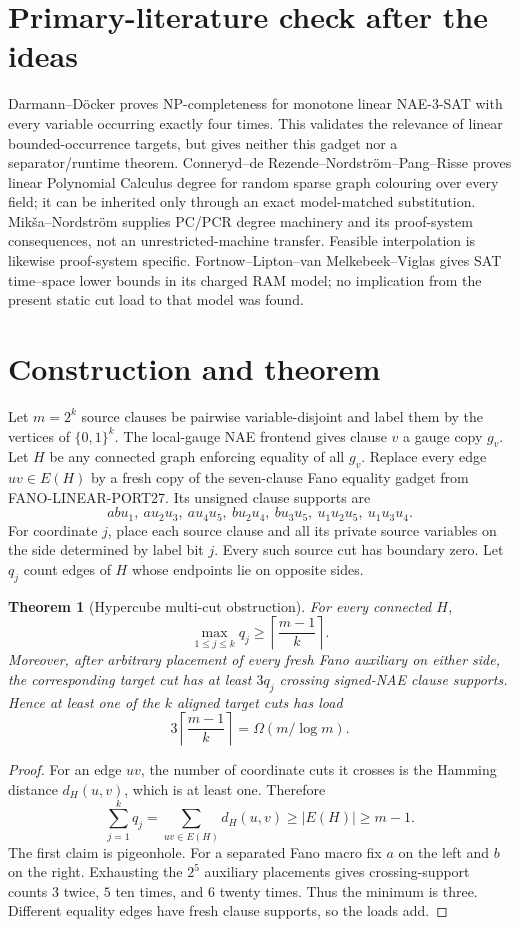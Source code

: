 \documentclass[11pt]{article}
\newtheorem{theorem}{Theorem}
\begin{document}
\section{Primary-literature check after the ideas}
Darmann--D\"ocker proves NP-completeness for monotone linear NAE-3-SAT with
every variable occurring exactly four times.  This validates the relevance of
linear bounded-occurrence targets, but gives neither this gadget nor a
separator/runtime theorem.  Conneryd--de Rezende--Nordstr\"om--Pang--Risse
proves linear Polynomial Calculus degree for random sparse graph colouring
over every field; it can be inherited only through an exact model-matched
substitution.  Mik\v{s}a--Nordstr\"om supplies PC/PCR degree machinery and its
proof-system consequences, not an unrestricted-machine transfer.  Feasible
interpolation is likewise proof-system specific.  Fortnow--Lipton--van
Melkebeek--Viglas gives SAT time--space lower bounds in its charged RAM model;
no implication from the present static cut load to that model was found.

\section{Construction and theorem}
Let $m=2^k$ source clauses be pairwise variable-disjoint and label them by the
vertices of $\{0,1\}^k$.  The local-gauge NAE frontend gives clause $v$ a gauge
copy $g_v$.  Let $H$ be any connected graph enforcing equality of all $g_v$.
Replace every edge $uv\in E(H)$ by a fresh copy of the seven-clause Fano
equality gadget from FANO-LINEAR-PORT27.  Its unsigned clause supports are
\[
abu_1,\ au_2u_3,\ au_4u_5,\ bu_2u_4,\ bu_3u_5,
\ u_1u_2u_5,\ u_1u_3u_4.
\]
For coordinate $j$, place each source clause and all its private source
variables on the side determined by label bit $j$.  Every such source cut has
boundary zero.  Let $q_j$ count edges of $H$ whose endpoints lie on opposite
sides.

\begin{theorem}[Hypercube multi-cut obstruction]
For every connected $H$,
\[
\max_{1\le j\le k}q_j\ge
\left\lceil\frac{m-1}{k}\right\rceil.
\]
Moreover, after arbitrary placement of every fresh Fano auxiliary on either
side, the corresponding target cut has at least $3q_j$ crossing signed-NAE
clause supports.  Hence at least one of the $k$ aligned target cuts has load
\[
3\left\lceil\frac{m-1}{k}\right\rceil
=\Omega(m/\log m).
\]
\end{theorem}
\begin{proof}
For an edge $uv$, the number of coordinate cuts it crosses is the Hamming
distance $d_H(u,v)$, which is at least one.  Therefore
\[
\sum_{j=1}^k q_j=\sum_{uv\in E(H)}d_H(u,v)
\ge |E(H)|\ge m-1.
\]
The first claim is pigeonhole.  For a separated Fano macro fix $a$ on the
left and $b$ on the right.  Exhausting the $2^5$ auxiliary placements gives
crossing-support counts $3$ twice, $5$ ten times, and $6$ twenty times.  Thus
the minimum is three.  Different equality edges have fresh clause supports,
so the loads add.
\end{proof}
\end{document}
